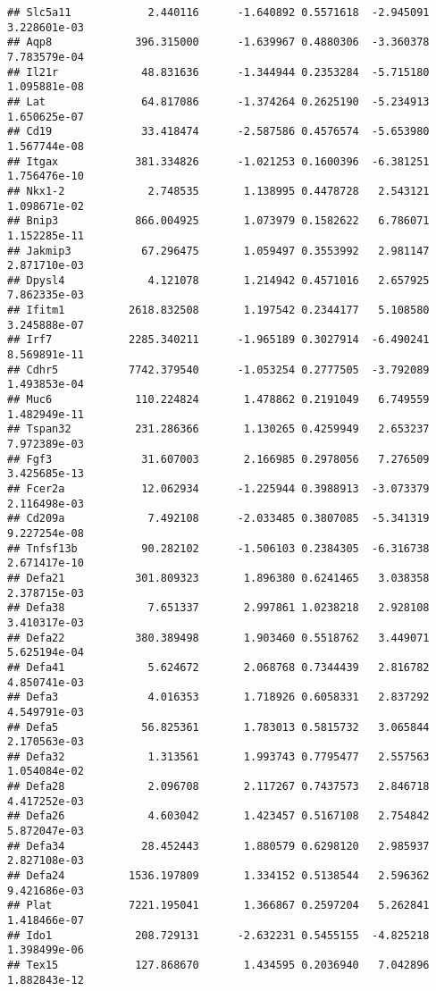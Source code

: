 \documentclass[
]{article}
\begin{document}
\begin{verbatim}
## Slc5a11            2.440116      -1.640892 0.5571618  -2.945091 3.228601e-03
## Aqp8             396.315000      -1.639967 0.4880306  -3.360378 7.783579e-04
## Il21r             48.831636      -1.344944 0.2353284  -5.715180 1.095881e-08
## Lat               64.817086      -1.374264 0.2625190  -5.234913 1.650625e-07
## Cd19              33.418474      -2.587586 0.4576574  -5.653980 1.567744e-08
## Itgax            381.334826      -1.021253 0.1600396  -6.381251 1.756476e-10
## Nkx1-2             2.748535       1.138995 0.4478728   2.543121 1.098671e-02
## Bnip3            866.004925       1.073979 0.1582622   6.786071 1.152285e-11
## Jakmip3           67.296475       1.059497 0.3553992   2.981147 2.871710e-03
## Dpysl4             4.121078       1.214942 0.4571016   2.657925 7.862335e-03
## Ifitm1          2618.832508       1.197542 0.2344177   5.108580 3.245888e-07
## Irf7            2285.340211      -1.965189 0.3027914  -6.490241 8.569891e-11
## Cdhr5           7742.379540      -1.053254 0.2777505  -3.792089 1.493853e-04
## Muc6             110.224824       1.478862 0.2191049   6.749559 1.482949e-11
## Tspan32          231.286366       1.130265 0.4259949   2.653237 7.972389e-03
## Fgf3              31.607003       2.166985 0.2978056   7.276509 3.425685e-13
## Fcer2a            12.062934      -1.225944 0.3988913  -3.073379 2.116498e-03
## Cd209a             7.492108      -2.033485 0.3807085  -5.341319 9.227254e-08
## Tnfsf13b          90.282102      -1.506103 0.2384305  -6.316738 2.671417e-10
## Defa21           301.809323       1.896380 0.6241465   3.038358 2.378715e-03
## Defa38             7.651337       2.997861 1.0238218   2.928108 3.410317e-03
## Defa22           380.389498       1.903460 0.5518762   3.449071 5.625194e-04
## Defa41             5.624672       2.068768 0.7344439   2.816782 4.850741e-03
## Defa3              4.016353       1.718926 0.6058331   2.837292 4.549791e-03
## Defa5             56.825361       1.783013 0.5815732   3.065844 2.170563e-03
## Defa32             1.313561       1.993743 0.7795477   2.557563 1.054084e-02
## Defa28             2.096708       2.117267 0.7437573   2.846718 4.417252e-03
## Defa26             4.603042       1.423457 0.5167108   2.754842 5.872047e-03
## Defa34            28.452443       1.880579 0.6298120   2.985937 2.827108e-03
## Defa24          1536.197809       1.334152 0.5138544   2.596362 9.421686e-03
## Plat            7221.195041       1.366867 0.2597204   5.262841 1.418466e-07
## Ido1             208.729131      -2.632231 0.5455155  -4.825218 1.398499e-06
## Tex15            127.868670       1.434595 0.2036940   7.042896 1.882843e-12

\end{verbatim}
\end{document}

